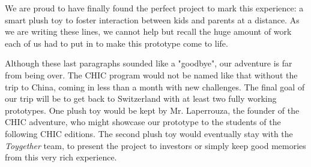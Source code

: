 \medskip We are proud to have finally found the perfect project to mark this experience: a smart plush toy to foster interaction between kids and parents at a distance. As we are writing these lines, we cannot help but recall the huge amount of work each of us had to put in to make this prototype come to life. %

\medskip Although these last paragraphs sounded like a "goodbye", our adventure is far from being over. The CHIC program would not be named like that without the trip to China, coming in less than a month with new challenges. The final goal of our trip will be to get back to Switzerland with at least two fully working prototypes. One plush toy would be kept by Mr. Laperrouza, the founder of the CHIC adventure, who might showcase our prototype to the students of the following CHIC editions. The second plush toy would eventually stay with the \textit{Toygether} team, to present the project to investors or simply keep good memories from this very rich experience.

